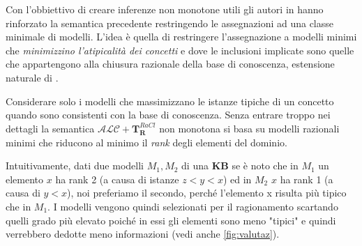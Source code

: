 Con l'obbiettivo di creare inferenze non monotone utili gli autori in \cite{FromPLtoDL} hanno rinforzato la semantica precedente restringendo le assegnazioni ad una classe minimale di modelli. 
L’idea è quella di restringere l’assegnazione a modelli minimi che \textit{minimizzino l'atipicalità dei concetti} e
dove le inclusioni implicate sono quelle che appartengono alla chiusura razionale della base di conoscenza, 
estensione naturale di \cite{Conditional_KB}.

Considerare solo i modelli che massimizzano le istanze tipiche di un concetto quando sono 
consistenti con la base di conoscenza.
Senza entrare troppo nei dettagli la semantica $\mathcal{ALC} + \mathbf{T}_{\mathbf{R}}^{\mathit{RaCl}}$
non monotona si basa su modelli razionali minimi che riducono al minimo il \textit{rank} degli elementi del dominio.

Intuitivamente, dati due modelli $ M_1, M_2 $ di una \textbf{KB} se è noto che 
in $ M_1 $ un elemento $ x $ ha rank 2 (a causa di istanze $ z < y < x $) ed
in $ M_2 $ $ x $ ha rank 1 (a causa di $ y < x $), noi preferiamo il secondo,
perché l’elemento x risulta più tipico che in $ M_1 $.
I modelli vengono quindi selezionati per il ragionamento scartando quelli grado più elevato poiché in essi gli elementi sono meno "tipici" e quindi verrebbero dedotte meno informazioni (vedi anche \ref{fig:valutaz}).

\clearpage


